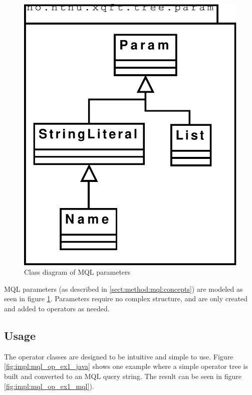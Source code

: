 \begin{figure}[!htp]
\begin{center}
  \includegraphics[scale=0.5]{diagrams/mql_param_uml}
  \caption{Class diagram of MQL parameters}
  \label{fig:impl:mql_param_uml}
\end{center}
\end{figure}

MQL parameters (as described in \ref{sect:method:mql:concepts}) are modeled as
seen in figure \ref{fig:impl:mql_param_uml}. Parameters require no complex
structure, and are only created and added to operators as needed.

\subsection{Usage}
The operator classes are designed to be intuitive and simple to use. Figure
\ref{fig:impl:mql_op_ex1_java} shows one example where a simple operator tree
is built and converted to an MQL query string. The result can be seen in figure \ref{fig:impl:mql_op_ex1_mql}).

